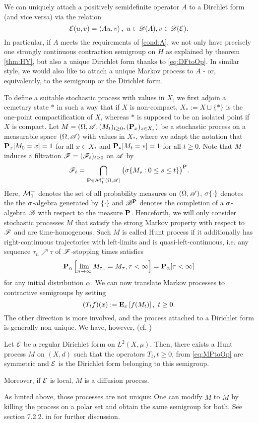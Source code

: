 We can uniquely attach a positively semidefinite operator $A$ to a Dirchlet form (and vice versa) via the relation 
\begin{equation}\label{eq:DFtoOp}
  \cE(u,v)=\left<Au,v\right>,\  u\in\scD(A),v\in\scD(\cE).
\end{equation}
In particular, if $A$ meets the requirements of \ref{cond:A}, we not only have precisely one strongly continuous contraction semigroup on $H$ as explained by theorem \ref{thm:HY}, but also a unique Dirichlet form thanks to \eqref{eq:DFtoOp}. In similar style, we would also like to attach a unique Markov process to $A$ - or, equivalently, to the semigroup or the Dirichlet form. 

To define a suitable stochastic process with values in $X$, we first adjoin a cemetary state $*$ in such a way that if $X$ is non-compact, $X_*:=X\sqcup\{*\}$ is the one-point compactification of $X$, whereas $*$ is supposed to be an isolated point if $X$ is compact. Let $M=\left(\gO,\scA,(M_t)_{t\geq0},(\Prob_x)_{x\in X_*}\right)$ be a stochastic process on a measurable space $(\gO,\scA)$ with values in $X_*$, where we adapt the notation that $\Prob_x[M_0=x]=1$ for all 
$x\in X_*$ and $\Prob_*[M_t=*]=1$ for all $t\geq0$. Note that $M$ induces a filtration $\scF=(\scF_t)_{t\geq0}$ on $\scA$ by 
\[
  \scF_t=\bigcap_{\Prob\in\cM^+_1(\gO,\scA)} \big(\gs\{M_s:0\leq s\leq t\}\big)^\Prob.
\]
Here, $\cM^+_1$ denotes the set of all probability measures on $(\gO,\scA)$, $\gs\{\cdot\}$ denotes the the $\gs$-algebra generated by $\{\cdot\}$ and $\scB^\Prob$ denotes the completion of a $\gs$-algebra $\scB$ with respect to the measure $\Prob$. Henceforth, we will only consider stochastic processes $M$ that satisfy the strong Markov property with respect to $\scF$ and are time-homogenous. Such $M$ is called Hunt process if it additionally has right-continuous trajectories with left-limits and is quasi-left-continuous, i.e.  any sequence $\tau_n\nearrow\tau$ of $\scF$-stopping times satisfies
\[
  \Prob_\ga\left[\lim_{n\to\infty} M_{\tau_n}=M_\tau,\tau<\infty\right]=\Prob_\ga[\tau<\infty]
\]
for any initial distribution $\ga$. We can now translate Markov processes to contractive semigroups by setting
\begin{equation}\label{eq:MPtoOp}
  (T_tf)(x):=\PTEp{f(M_t)}{x},\ t\geq0.
\end{equation}
The other direction is more involved, and the process attached to a Dirichlet form is generally non-unique. We have, however, (cf. \cite[theorems 7.2.1 and 7.2.2]{fukushima2011dirichlet})
\begin{thm}\label{thm:fukushima}
  Let $\cE$ be a regular Dirichlet form on $L^2(X,\mu)$. Then, there exists a Hunt process $M$ on $(X,d)$ such that the operators $T_t, t\geq0$, from \eqref{eq:MPtoOp} are symmetric and $\cE$ is the Dirichlet form belonging to this semigroup.
  
  Moreover, if $\cE$ is local, $M$ is a diffusion process.
\end{thm}
As hinted above, those processes are not unique: One can modify $M$ to $\tilde M$ by killing the process on a polar set and obtain the same semigroup for both. See section 7.2.2. in \cite{fukushima2011dirichlet} for further discussion.


